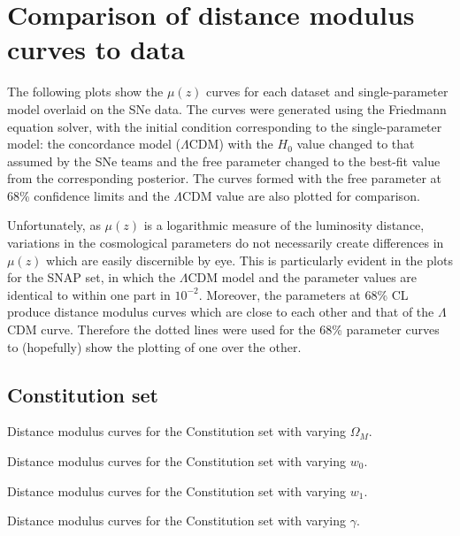 \chapter{Comparison of distance modulus curves to data}
\label{app:distance-modulus-curves}

The following plots show the $\mu(z)$ curves for each dataset and single-parameter model overlaid on the SNe data. The curves were generated using the Friedmann equation solver, with the initial condition corresponding to the single-parameter model: the concordance model ($\Lambda$CDM) with the $H_0$ value changed to that assumed by the SNe teams and the free parameter changed to the best-fit value from the corresponding posterior. The curves formed with the free parameter at 68\% confidence limits and the $\Lambda$CDM value are also plotted for comparison. 

Unfortunately, as $\mu(z)$ is a logarithmic measure of the luminosity distance, variations in the cosmological parameters do not necessarily create differences in $\mu(z)$ which are easily discernible by eye. This is particularly evident in the plots for the SNAP set, in which the $\Lambda$CDM model and the parameter values are identical to within one part in $10^{-2}$. Moreover, the parameters at 68\% CL produce distance modulus curves which are close to each other and that of the $\Lambda$CDM curve. Therefore the dotted lines were used for the 68\% parameter curves to (hopefully) show the plotting of one over the other.

\clearpage

\section{Constitution set}
\label{sec:constitution-set}

  {Distance modulus curves for the Constitution set with varying $\Omega_M$.}

  {Distance modulus curves for the Constitution set with varying $w_0$.}

  {Distance modulus curves for the Constitution set with varying $w_1$.}

  {Distance modulus curves for the Constitution set with varying $\gamma$.}

